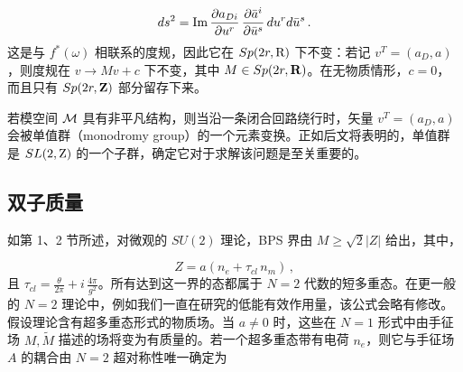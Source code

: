 $$
ds^{2} = {\rm Im} \, \frac{\partial a_{Di}}{\partial u^{r}} \,
\frac{\partial \bar{a}^{i}}{\partial \bar{u}^{s}} \,
du^{r} d\bar{u}^{s}\,.
$$
这是与 $f^*(\omega)$ 相联系的度规，因此它在 $Sp(2r,{\rm R})$ 下不变：若记 $v^T =(a_D, a )$，则度规在 $v\rightarrow Mv + c$ 下不变，其中 $M \in Sp(2r,{\bf R})$。在无物质情形，$c=0$，而且只有 $Sp(2r,{\bf Z})$ 部分留存下来。

若模空间 ${\cal M}$ 具有非平凡结构，则当沿一条闭合回路绕行时，矢量 $v^T=(a_D, a)$ 会被单值群（monodromy group）的一个元素变换。正如后文将表明的，单值群是 $SL(2,{\rm Z})$ 的一个子群，确定它对于求解该问题是至关重要的。


\subsection{双子质量}

如第 1、2 节所述，对微观的 $SU(2)$ 理论，BPS 界由 $M \geq \sqrt{2} |Z|$ 给出，其中，

$$
Z=a(n_e + \tau_{cl}\, n_m)\,, 
$$
且 $\tau_{cl}=\frac{\theta}{2\pi}+i\,\frac{4\pi}{g^2}$。所有达到这一界的态都属于 $N=2$ 代数的短多重态。在更一般的 $N=2$ 理论中，例如我们一直在研究的低能有效作用量，该公式会略有修改。假设理论含有超多重态形式的物质场。当 $a\ne 0$ 时，这些在 $N=1$ 形式中由手征场 $M, \widetilde M$ 描述的场将变为有质量的。若一个超多重态带有电荷 $n_e$，则它与手征场 $A$ 的耦合由 $N=2$ 超对称性唯一确定为

